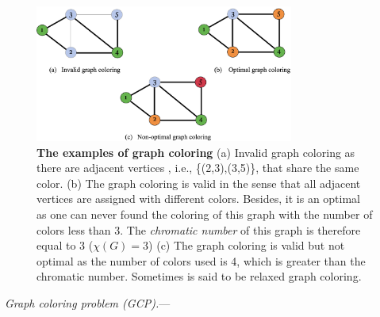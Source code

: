 \documentclass[%
 reprint,
nofootinbib,
 amsmath,amssymb,
 aps,
floatfix,
]{revtex4-2}
\begin{document}
\begin{figure}[ht!]
    \centering
    \includegraphics[width=8.5cm]{picture/color_matching.png}
    \caption{\textbf{The examples of graph coloring} (a) Invalid graph coloring as there are adjacent vertices , i.e., \{(2,3),(3,5)\}, that share the same color. (b) The graph coloring is valid in the sense that all adjacent vertices are assigned with different colors. Besides, it is an optimal as one can never found the coloring of this graph with the number of colors less than 3. The \emph{chromatic number} of this graph is therefore equal to 3 ($\chi(G)=3$) (c) The graph coloring is valid but not optimal as the number of colors used is 4, which is greater than the chromatic number. Sometimes is said to be relaxed graph coloring.} 
    \label{fig:graph_coloring}
\end{figure}

\emph{Graph coloring problem (GCP).}--- \\
\end{document}

